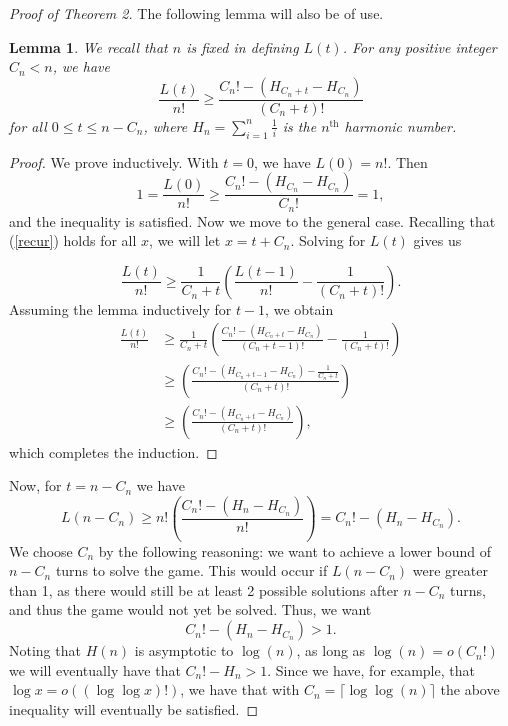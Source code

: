 \documentclass[12pt, a4paper]{article}
\newcommand{\nth}{^{\text{th}}}       %
\newtheorem{lemma}{Lemma}
\begin{document}
\begin{proof}[Proof of Theorem 2]
		The following lemma will also be of use.
		\begin{lemma} We recall that $n$ is fixed in defining $L(t)$. For any positive integer $C_n < n$, we have
			\begin{equation*}
				\frac{L(t)}{n!}\ge \frac{C_{n}! - (H_{C_{n}+t} - H_{C_{n}})}{(C_n+t)!}
			\end{equation*}
			for all $0\le t\le n-C_{n}$, where $H_n=\sum_{i = 1}^n\frac{1}{i}$ is the $n\nth$ harmonic number.
		\end{lemma}
		\begin{proof} We prove inductively. With $t=0$, we have $L(0) = n!$. Then
			\begin{equation*}
			1 =\frac{L(0)}{n!}\ge \frac{C_{n}! - (H_{C_{n}}-H_{C_{n}})}{C_{n}!} = 1,
			\end{equation*}
			and the inequality is satisfied. Now we move to the general case.
			Recalling that (\ref{recur}) holds for all $x$, we will
		let $x=t+C_{n}$. Solving for $L(t)$ gives us
		
			\begin{equation*}
			\frac{L(t)}{n!}
			 \ge \frac{1}{C_{n}+t}\left(\frac{L(t-1)}{n!}
			-\frac{1}{(C_{n}+t)!}\right).
			\end{equation*}
		Assuming the lemma inductively for $t-1$, we obtain
			\begin{align*}
			\frac{L(t)}{n!}
			& \ge \frac{1}{C_{n}+t}\left(\frac{C_{n}!-(H_{C_{n}+t} - H_{C_{n}})}
			{(C_{n}+t-1)!} - \frac{1}{(C_{n}+t)!}\right)\\
			& \ge \left(\frac{C_{n}! - (H_{C_{n}+t-1} - H_{C_{n}}) - \frac{1}{C_{n}+t}}
			{(C_{n}+t)!}\right)\\
			& \ge \left(\frac{C_{n}! - (H_{C_{n}+t} - H_{C_{n}})}{(C_{n}+t)!}\right),
			\end{align*}
			which completes the induction.
		\end{proof}

	Now, for $t = n-C_n$ we have
	\begin{equation*}
	L(n-C_{n})  \ge n!\left(\frac{C_{n}! - (H_n - H_{C_{n}})}{n!}\right)
	 = C_{n}! - (H_n-H_{C_{n}}).
	\end{equation*}
	We choose $C_{n}$ by the following reasoning: we want to achieve a lower bound of $n-C_{n}$ turns to solve the game. This would occur if $L(n-C_n)$ were greater than 1, as there would still be at least 2 possible solutions after $n-C_n$ turns, and thus the game would not yet be solved. Thus, we want
		\begin{equation*}
			C_{n}! - (H_n - H_{C_{n}}) > 1.
		\end{equation*}
		Noting that $H(n)$ is asymptotic to $\log(n)$, as long as $\log(n) = o(C_n!)$ we will eventually have that $C_n!-H_n > 1$. Since we have, for example, that $\log x = o((\log \log x)!)$, we have that with $C_n = \lceil \log \log(n) \rceil$ the above inequality will eventually be satisfied.
		

\end{proof}
\end{document}
